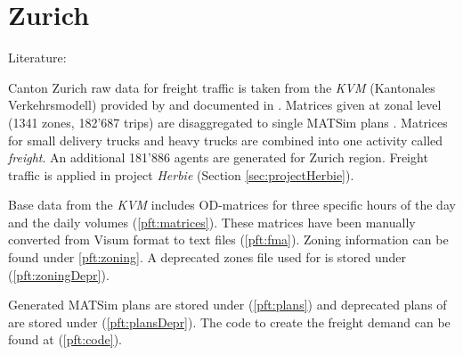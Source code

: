 

\section{Zurich}

Literature: \citet[][]{ShahM_TechRep_IVT_2010}


Canton Zurich raw data for freight traffic is taken from the \emph{KVM} (Kantonales Verkehrsmodell) provided by \citet{AMV_Webpage_2011} and documented in \citet[][]{GottardiBuergler_SV_1999}. Matrices given at zonal level (1341 zones, 182'687 trips) are disaggregated to single MATSim plans \citep[][]{ShahM_TechRep_IVT_2010}. Matrices for small delivery trucks and heavy trucks are combined into one activity called \emph{freight}. An additional 181'886 agents are generated for Zurich region. Freight traffic is applied in project \emph{Herbie} (Section \ref{sec:projectHerbie}).

Base data from the \emph{KVM} includes OD-matrices for three specific hours of the day and the daily volumes (\ref{pft:matrices}). These matrices have been manually converted from Visum format to text files (\ref{pft:fma}). Zoning information can be found under \ref{pft:zoning}. A deprecated zones file used for \citet[][]{ShahM_TechRep_IVT_2010} is stored under (\ref{pft:zoningDepr}).

Generated MATSim plans are stored under (\ref{pft:plans}) and deprecated plans of \citet[][]{ShahM_TechRep_IVT_2010} are stored under (\ref{pft:plansDepr}). The code to create the freight demand can be found at (\ref{pft:code}).

